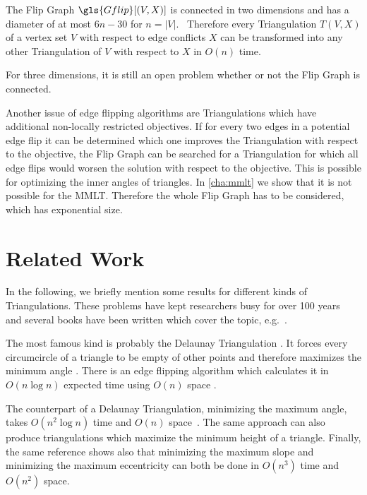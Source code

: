 \begin{theorem}
  The Flip Graph \(\gls{Gflip}[(V,X)]\) is connected in two dimensions
  \cite[Behauptung 4]{flip_graph_connected} and has a diameter of
  at most \(6n - 30\) for \(n = |V|\).~\cite{flip_graph_diameter}
  Therefore every Triangulation \(T(V,X)\) of a vertex set \(V\)
  with respect to edge conflicts \(X\) can be transformed into any
  other Triangulation of \(V\) with respect to \(X\) in \(O(n)\)
  time.
  
  For three dimensions, it is still an open problem whether
  or not the Flip Graph is connected.~\cite{flip_graph_3d}
\end{theorem}

Another issue of edge flipping algorithms are Triangulations
which have additional non-locally restricted objectives. If for every
two edges in a potential edge flip it can be determined which one
improves the Triangulation with respect to the objective, the Flip
Graph can be searched for a Triangulation for which all edge flips
would worsen the solution with respect to the objective. This is
possible for optimizing the inner angles of triangles. In
\cref{cha:mmlt} we show that it is not possible for the \gls{MMLT}.
Therefore the whole Flip Graph has to be considered, which has
exponential size.

\section{Related Work}
\label{sec:related_work}
In the following, we briefly mention some results for different kinds
of Triangulations. These problems have kept researchers busy
for over 100 years~\cite{triangulation_hilbert} and several
books have been written which cover the topic,
e.g.~\cite{triangulation_book}.

The most famous kind is probably the Delaunay Triangulation
\cite[Section 9.2]{deberg_compgeom}. It forces every circumcircle
of a triangle to be empty of other points and therefore maximizes
the minimum angle \cite[Theorem 9.9]{deberg_compgeom}. There is an
edge flipping algorithm which calculates it in \(O(n \log n)\) 
expected time using \(O(n)\) space 
\cite[Theorem 9.12]{deberg_compgeom}.

The counterpart of a Delaunay Triangulation, 
minimizing the maximum angle, takes \(O(n^2 \log n)\) time and
\(O(n)\) space~\cite{triangulation_edge_insertion}. The same
approach can also produce triangulations which maximize the minimum 
height of a triangle. Finally, the same reference shows also that 
minimizing the maximum slope and minimizing the maximum eccentricity 
can both be done in \(O(n^3)\) time and \(O(n^2)\) space.

